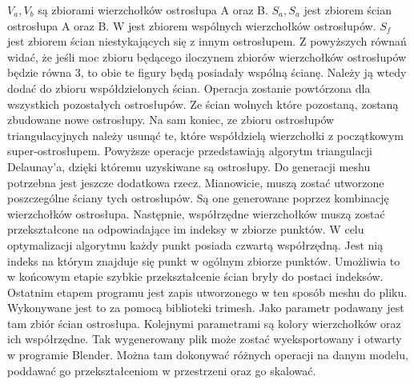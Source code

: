 $V_{a},V_{b}$ są zbiorami wierzchołków ostrosłupa A oraz B. $S_{a},S_{a}$ jest zbiorem ścian ostrosłupa A oraz B. W jest zbiorem wspólnych wierzchołków ostrosłupów. $S_{f}$ jest zbiorem ścian niestykających się z innym ostrosłupem.
\newline \indent Z powyższych równań widać, że jeśli moc zbioru będącego iloczynem zbiorów wierzchołków ostrosłupów będzie równa 3, to obie te figury będą posiadały wspólną ścianę. Należy ją wtedy dodać do zbioru współdzielonych ścian. Operacja zostanie powtórzona dla wszystkich pozostałych ostrosłupów. Ze ścian wolnych które pozostaną, zostaną zbudowane nowe ostrosłupy.
\newline \indent Na sam koniec, ze zbioru ostrosłupów triangulacyjnych należy usunąć te, które współdzielą wierzchołki z początkowym super-ostrosłupem.
\newline \indent Powyższe operacje przedstawiają algorytm triangulacji Delaunay'a, dzięki któremu uzyskiwane są ostrosłupy. Do generacji meshu potrzebna jest jeszcze dodatkowa rzecz. Mianowicie, muszą zostać utworzone poszczególne ściany tych ostrosłupów. Są one generowane poprzez kombinację wierzchołków ostrosłupa. Następnie, współrzędne wierzchołków muszą zostać przekształcone na odpowiadające im indeksy w zbiorze punktów. W celu optymalizacji algorytmu każdy punkt posiada czwartą współrzędną. Jest nią indeks na którym znajduje się punkt w ogólnym zbiorze punktów. Umożliwia to w końcowym etapie szybkie przekształcenie ścian bryły do postaci indeksów.
\newline \indent Ostatnim etapem programu jest zapis utworzonego w ten sposób meshu do pliku. Wykonywane jest to za pomocą biblioteki trimesh. Jako parametr podawany jest tam zbiór ścian ostrosłupa. Kolejnymi parametrami są kolory wierzchołków oraz ich współrzędne. Tak wygenerowany plik może zostać wyeksportowany i otwarty w programie Blender. Można tam dokonywać różnych operacji na danym modelu, poddawać go przekształceniom w przestrzeni oraz go skalować.
